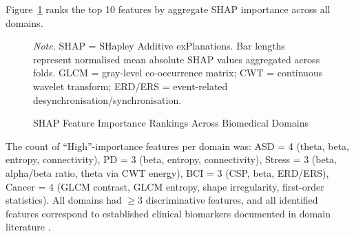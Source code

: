 Figure~\ref{fig:ch5_shap} ranks the top 10 features by aggregate SHAP importance across all domains.

\begin{figure}[H]
    \caption{SHAP Feature Importance Rankings Across Biomedical Domains}
    \label{fig:ch5_shap}
    \vspace{0.5em}\noindent\textit{Note.} SHAP = SHapley Additive exPlanations. Bar lengths represent normalised mean absolute SHAP values aggregated across folds. GLCM = gray-level co-occurrence matrix; CWT = continuous wavelet transform; ERD/ERS = event-related desynchronisation/synchronisation.
\end{figure}

The count of ``High''-importance features per domain was: ASD = 4 (theta, beta, entropy, connectivity), PD = 3 (beta, entropy, connectivity), Stress = 3 (beta, alpha/beta ratio, theta via CWT energy), BCI = 3 (CSP, beta, ERD/ERS), Cancer = 4 (GLCM contrast, GLCM entropy, shape irregularity, first-order statistics). All domains had $\geq$3 discriminative features, and all identified features correspond to established clinical biomarkers documented in domain literature \citep{bosl2018eeg, geraedts2018eeg, pfurtscheller1999bci, aerts2014radiomics, haralick1973glcm}.

